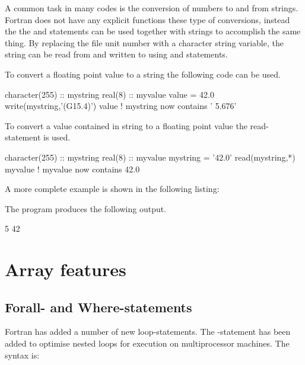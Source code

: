 A common task in many codes is the conversion of numbers to and from strings. Fortran does not have any explicit functions these type of conversions, instead the the  and  statements can be used together with strings to accomplish the same thing. By replacing the file unit number with a character string variable, the string can be read from and written to using  and  statements.

To convert a floating point value to a string the following code can be used.

\begin{fortrancodeenv}
character(255) :: mystring
real(8) :: myvalue
value = 42.0
write(mystring,'(G15.4)') value
! mystring now contains '      5.676'
\end{fortrancodeenv}

To convert a value contained in string to a floating point value the read-statement is used.

\begin{fortrancodeenv}
character(255) :: mystring
real(8) :: myvalue
mystring = '42.0'
read(mystring,*) myvalue
! myvalue now contains 42.0
\end{fortrancodeenv}

A more complete example is shown in the following listing:


The program produces the following output.

\begin{fortrancodeenv}
5
42
\end{fortrancodeenv}

\section{Array features}

\subsection{Forall- and Where-statements}

Fortran has added a number of new loop-statements. The -statement has been added to optimise nested loops for execution on multiprocessor machines. The syntax is:

